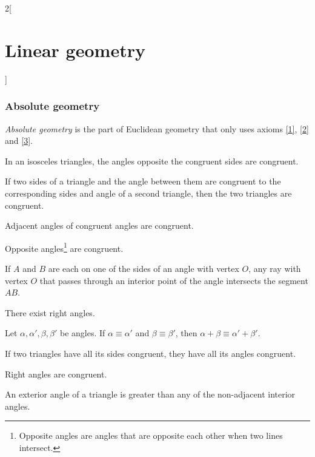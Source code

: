 \documentclass[../../../main.tex]{subfiles}
\begin{document}
\begin{multicols}{2}[\section{Linear geometry}]
  \subsubsection{Absolute geometry}
  \begin{definition}
    \textit{Absolute geometry} is the part of Euclidean geometry that only uses axioms \ref{1}, \ref{2} and \ref{3}.
  \end{definition}
  \begin{theorem}
    In an isosceles triangles, the angles opposite the congruent sides are congruent.
  \end{theorem}
  \begin{theorem}
    If two sides of a triangle and the angle between them are congruent to the corresponding sides and angle of a second triangle, then the two triangles are congruent.
  \end{theorem}
  \begin{theorem}
    Adjacent angles of congruent angles are congruent.
  \end{theorem}
  \begin{theorem}
    Opposite angles\footnote{Opposite angles are angles that are opposite each other when two lines intersect.} are congruent.
  \end{theorem}
  \begin{theorem}
    If $A$ and $B$ are each on one of the sides of an angle with vertex $O$, any ray with vertex $O$ that passes through an interior point of the angle intersects the segment $AB$.
  \end{theorem}
  \begin{theorem}
    There exist right angles.
  \end{theorem}
  \begin{theorem}
    Let $\alpha,\alpha',\beta,\beta'$ be angles. If $\alpha\equiv\alpha'$ and $\beta\equiv\beta'$, then $\alpha+\beta\equiv\alpha'+\beta'$.
  \end{theorem}
  \begin{theorem}
    If two triangles have all its sides congruent, they have all its angles congruent.
  \end{theorem}
  \begin{theorem}
    Right angles are congruent.
  \end{theorem}
  \begin{theorem}
    An exterior angle of a triangle is greater than any of the non-adjacent interior angles.
  \end{theorem}

\end{multicols}
\end{document}
